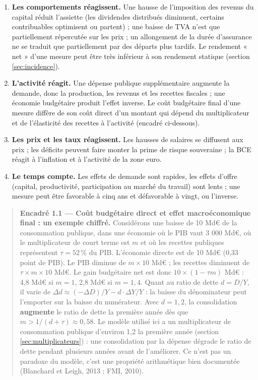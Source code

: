 \documentclass[
  11pt,
  11pt,
  a4paper,
  openany]{book}
\providecommand{\tightlist}{%
  \setlength{\itemsep}{0pt}\setlength{\parskip}{0pt}}
\begin{document}
\begin{enumerate}
\def\labelenumi{\arabic{enumi}.}
\tightlist
\item
  \textbf{Les comportements réagissent.} Une hausse de l'imposition des
  revenus du capital réduit l'assiette (les dividendes distribués
  diminuent, certains contribuables optimisent ou partent) ; une baisse
  de TVA n'est que partiellement répercutée sur les prix ; un
  allongement de la durée d'assurance ne se traduit que partiellement
  par des départs plus tardifs. Le rendement « net » d'une mesure peut
  être très inférieur à son rendement statique (section
  \ref{sec:incidence}).
\item
  \textbf{L'activité réagit.} Une dépense publique supplémentaire
  augmente la demande, donc la production, les revenus et les recettes
  fiscales ; une économie budgétaire produit l'effet inverse. Le coût
  budgétaire final d'une mesure diffère de son coût direct d'un montant
  qui dépend du multiplicateur et de l'élasticité des recettes à
  l'activité (encadré ci-dessous).
\item
  \textbf{Les prix et les taux réagissent.} Les hausses de salaires se
  diffusent aux prix ; les déficits peuvent faire monter la prime de
  risque souveraine ; la BCE réagit à l'inflation et à l'activité de la
  zone euro.
\item
  \textbf{Le temps compte.} Les effets de demande sont rapides, les
  effets d'offre (capital, productivité, participation au marché du
  travail) sont lents ; une mesure peut être favorable à cinq ans et
  défavorable à vingt, ou l'inverse.
\end{enumerate}

\begin{quote}
\textbf{Encadré 1.1 --- Coût budgétaire direct et effet macroéconomique
final : un exemple chiffré.} Considérons une baisse de 10 Md€ de la
consommation publique, dans une économie où le PIB vaut 3 000 Md€, où le
multiplicateur de court terme est \(m\) et où les recettes publiques
représentent \(\tau = 52\,\%\) du PIB. L'économie directe est de 10 Md€
(0,33 point de PIB). Le PIB diminue de \(m \times 10\) Md€ ; les
recettes diminuent de \(\tau \times m \times 10\) Md€. Le gain
budgétaire net est donc \(10 \times (1 - \tau m)\) Md€ : 4,8 Md€ si
\(m = 1\), 2,8 Md€ si \(m = 1{,}4\). Quant au ratio de dette
\(d = D/Y\), il varie de
\(\Delta d \approx (-\Delta D)/Y - d \cdot \Delta Y / Y\) : la baisse du
dénominateur peut l'emporter sur la baisse du numérateur. Avec
\(d = 1{,}2\), la consolidation \textbf{augmente} le ratio de dette la
première année dès que \(m > 1/(d + \tau) \approx 0{,}58\). Le modèle
utilisé ici a un multiplicateur de consommation publique d'environ 1,2
la première année (section \ref{sec:multiplicateurs}) : une
consolidation par la dépense dégrade le ratio de dette pendant plusieurs
années avant de l'améliorer. Ce n'est pas un paradoxe du modèle, c'est
une propriété arithmétique bien documentée (Blanchard et Leigh, 2013 ;
FMI, 2010).
\end{quote}
\end{document}
